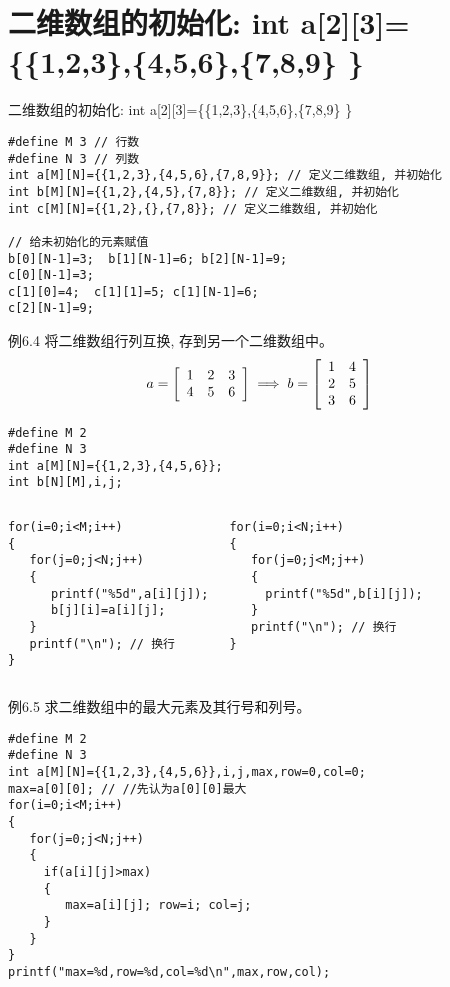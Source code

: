 \section{二维数组的初始化: int a[2][3]=\{\{1,2,3\},\{4,5,6\},\{7,8,9\} \}}

\begin{frame}{二维数组的初始化: int a[2][3]=\{\{1,2,3\},\{4,5,6\},\{7,8,9\} \}}
\begin{lstlisting}
#define M 3 // 行数
#define N 3 // 列数
int a[M][N]={{1,2,3},{4,5,6},{7,8,9}}; // 定义二维数组, 并初始化
int b[M][N]={{1,2},{4,5},{7,8}}; // 定义二维数组, 并初始化
int c[M][N]={{1,2},{},{7,8}}; // 定义二维数组, 并初始化

// 给未初始化的元素赋值
b[0][N-1]=3;  b[1][N-1]=6; b[2][N-1]=9;
c[0][N-1]=3; 
c[1][0]=4;  c[1][1]=5; c[1][N-1]=6; 
c[2][N-1]=9;
\end{lstlisting}
\end{frame}

\begin{frame}{例6.4 将二维数组行列互换, 存到另一个二维数组中。}
\small
\[
a=\left[
\begin{array}[c]{ccc}
1 & 2 & 3\\
4 & 5 & 6
\end{array}
\right]
\implies
b=\left[
\begin{array}[c]{cc}
1 & 4\\
2 & 5\\
3 & 6
\end{array}
\right]
\]
\pause
\begin{lstlisting}
#define M 2 
#define N 3 
int a[M][N]={{1,2,3},{4,5,6}};
int b[N][M],i,j;
\end{lstlisting}
\begin{columns}[T]
\pause
\begin{lstlisting}
for(i=0;i<M;i++) 
{
   for(j=0;j<N;j++) 
   {
      printf("%5d",a[i][j]);
      b[j][i]=a[i][j]; 
   }
   printf("\n"); // 换行
}
\end{lstlisting}
\pause
\begin{lstlisting}
for(i=0;i<N;i++) 
{
   for(j=0;j<M;j++) 
   {
     printf("%5d",b[i][j]); 
   }
   printf("\n"); // 换行
}
\end{lstlisting}
\end{columns}
\vspace{0.001cm}
\end{frame}

\begin{frame}{例6.5 求二维数组中的最大元素及其行号和列号。}
\begin{lstlisting}
#define M 2 
#define N 3 
int a[M][N]={{1,2,3},{4,5,6}},i,j,max,row=0,col=0;
max=a[0][0]; // //先认为a[0][0]最大
for(i=0;i<M;i++) 
{
   for(j=0;j<N;j++) 
   {
     if(a[i][j]>max)
     { 
        max=a[i][j]; row=i; col=j;
     } 
   }
}
printf("max=%d,row=%d,col=%d\n",max,row,col);
\end{lstlisting}
\end{frame}

